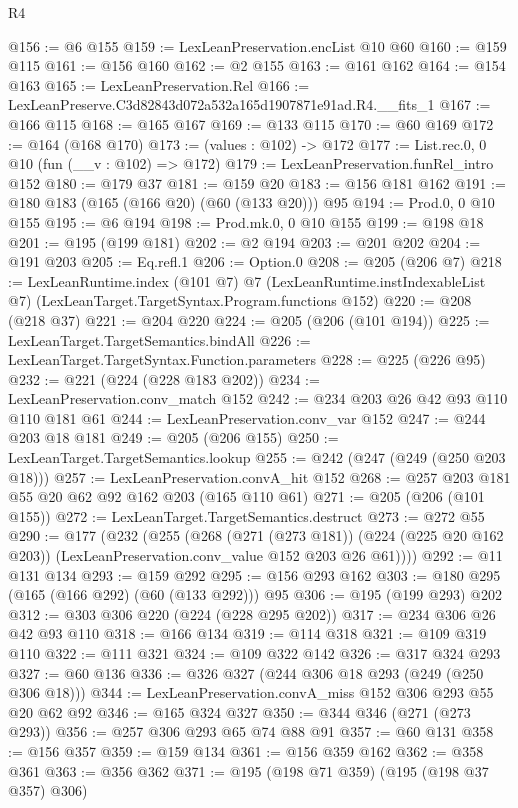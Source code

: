 \begin{lexlean}{R4}
\begin{coremodule}
@156 := @6 @155
@159 := LexLeanPreservation.encList @10 @60
@160 := @159 @115
@161 := @156 @160
@162 := @2 @155
@163 := @161 @162
@164 := @154 @163
@165 := LexLeanPreservation.Rel
@166 := LexLeanPreserve.C3d82843d072a532a165d1907871e91ad.R4.__fits_1
@167 := @166 @115
@168 := @165 @167
@169 := @133 @115
@170 := @60 @169
@172 := @164 (@168 @170)
@173 := (values : @102) -> @172
@177 := List.rec.{0, 0} @10 (fun (__v : @102) => @172)
@179 := LexLeanPreservation.funRel_intro @152
@180 := @179 @37
@181 := @159 @20
@183 := @156 @181 @162
@191 := @180 @183 (@165 (@166 @20) (@60 (@133 @20))) @95
@194 := Prod.{0, 0} @10 @155
@195 := @6 @194
@198 := Prod.mk.{0, 0} @10 @155
@199 := @198 @18
@201 := @195 (@199 @181)
@202 := @2 @194
@203 := @201 @202
@204 := @191 @203
@205 := Eq.refl.{1}
@206 := Option.{0}
@208 := @205 (@206 @7)
@218 := LexLeanRuntime.index
    (@101 @7)
    @7
    (LexLeanRuntime.instIndexableList @7)
    (LexLeanTarget.TargetSyntax.Program.functions @152)
@220 := @208 (@218 @37)
@221 := @204 @220
@224 := @205 (@206 (@101 @194))
@225 := LexLeanTarget.TargetSemantics.bindAll
@226 := LexLeanTarget.TargetSyntax.Function.parameters
@228 := @225 (@226 @95)
@232 := @221 (@224 (@228 @183 @202))
@234 := LexLeanPreservation.conv_match @152
@242 := @234 @203 @26 @42 @93 @110 @110 @181 @61
@244 := LexLeanPreservation.conv_var @152
@247 := @244 @203 @18 @181
@249 := @205 (@206 @155)
@250 := LexLeanTarget.TargetSemantics.lookup
@255 := @242 (@247 (@249 (@250 @203 @18)))
@257 := LexLeanPreservation.convA_hit @152
@268 := @257 @203 @181 @55 @20 @62 @92 @162 @203 (@165 @110 @61)
@271 := @205 (@206 (@101 @155))
@272 := LexLeanTarget.TargetSemantics.destruct
@273 := @272 @55
@290 := @177
    (@232
      (@255
        (@268
          (@271 (@273 @181))
          (@224 (@225 @20 @162 @203))
          (LexLeanPreservation.conv_value @152 @203 @26 @61))))
@292 := @11 @131 @134
@293 := @159 @292
@295 := @156 @293 @162
@303 := @180 @295 (@165 (@166 @292) (@60 (@133 @292))) @95
@306 := @195 (@199 @293) @202
@312 := @303 @306 @220 (@224 (@228 @295 @202))
@317 := @234 @306 @26 @42 @93 @110
@318 := @166 @134
@319 := @114 @318
@321 := @109 @319 @110
@322 := @111 @321
@324 := @109 @322 @142
@326 := @317 @324 @293
@327 := @60 @136
@336 := @326 @327 (@244 @306 @18 @293 (@249 (@250 @306 @18)))
@344 := LexLeanPreservation.convA_miss @152 @306 @293 @55 @20 @62 @92
@346 := @165 @324 @327
@350 := @344 @346 (@271 (@273 @293))
@356 := @257 @306 @293 @65 @74 @88 @91
@357 := @60 @131
@358 := @156 @357
@359 := @159 @134
@361 := @156 @359 @162
@362 := @358 @361
@363 := @356 @362
@371 := @195 (@198 @71 @359) (@195 (@198 @37 @357) @306)

\end{coremodule}
\end{lexlean}
